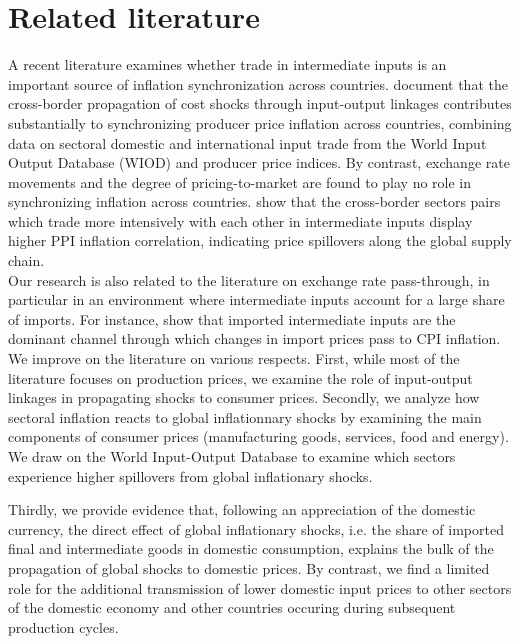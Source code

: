 \documentclass[11pt,a4paper]{article}
\begin{document}
\section{Related literature}
\label{sec:lit}
A recent literature examines whether trade in intermediate inputs is an important source of inflation synchronization across countries.
\cite{Auer2017} document that the cross-border propagation of cost shocks through input-output
linkages contributes substantially to synchronizing producer price inflation across countries, combining data on sectoral domestic and international input trade from the World Input Output
Database (WIOD) and producer price indices. By contrast, exchange rate movements and the degree of pricing-to-market are found to play no role in synchronizing inflation across countries.
\cite{AntoundeAlmeida2016} show that the cross-border sectors pairs which trade more intensively with each other in intermediate inputs display higher PPI inflation correlation, indicating  price spillovers along the global supply chain.\\

Our research is also related to the literature on exchange rate pass-through, in particular in an environment where intermediate inputs account for a large share of imports. For instance,  \cite{Goldberg2010} show that imported intermediate inputs are the dominant channel through which changes in import prices pass to CPI inflation.\\
We improve on the literature on various respects. First, while most of the literature focuses on production prices, we examine the role of input-output linkages in propagating shocks to consumer prices. 
Secondly, we analyze how sectoral inflation reacts to global inflationnary shocks by examining the main components of consumer prices (manufacturing goods, services, food and energy).  We draw on the World Input-Output Database to examine which sectors experience higher spillovers from global inflationary shocks.

Thirdly, we provide evidence that, following an appreciation of the domestic currency, the direct effect of global inflationary shocks, i.e. the share of imported final and intermediate goods in domestic consumption, explains the bulk of the propagation of global shocks to domestic prices. By contrast, we find a limited role for the additional transmission of lower domestic input prices to other sectors of the domestic economy and other countries occuring during subsequent production cycles.
\end{document}

